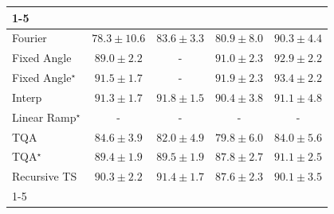 \begin{tabular}{l|cccc|}
\cline{1-5}
\multicolumn{5}{c}{\rule{0pt}{8pt}SV} \\
\midrule
Fourier & {\cellcolor[HTML]{A2BCDA}} \color[HTML]{000000} $78.3\pm 10.6$ & {\cellcolor[HTML]{4295C3}} \color[HTML]{F1F1F1} $83.6\pm 3.3$ & {\cellcolor[HTML]{78ABD0}} \color[HTML]{F1F1F1} $80.9\pm 8.0$ & {\cellcolor[HTML]{045A8D}} \color[HTML]{F1F1F1} $90.3\pm 4.4$ \\
Fixed Angle & {\cellcolor[HTML]{04639B}} \color[HTML]{F1F1F1} $89.0\pm 2.2$ & {\cellcolor[HTML]{000000}} \color[HTML]{F1F1F1} {\cellcolor{white}} \color{black} - & {\cellcolor[HTML]{045382}} \color[HTML]{F1F1F1} $91.0\pm 2.3$ & {\cellcolor[HTML]{023D60}} \color[HTML]{F1F1F1} $92.9\pm 2.2$ \\
Fixed Angle$^\star$ & {\cellcolor[HTML]{034C78}} \color[HTML]{F1F1F1} $91.5\pm 1.7$ & {\cellcolor[HTML]{000000}} \color[HTML]{F1F1F1} {\cellcolor{white}} \color{black} - & {\cellcolor[HTML]{034871}} \color[HTML]{F1F1F1} $91.9\pm 2.3$ & {\cellcolor[HTML]{023858}} \color[HTML]{F1F1F1} $93.4\pm 2.2$ \\
Interp & {\cellcolor[HTML]{034E7B}} \color[HTML]{F1F1F1} $91.3\pm 1.7$ & {\cellcolor[HTML]{034973}} \color[HTML]{F1F1F1} $91.8\pm 1.5$ & {\cellcolor[HTML]{04598C}} \color[HTML]{F1F1F1} $90.4\pm 3.8$ & {\cellcolor[HTML]{045280}} \color[HTML]{F1F1F1} $91.1\pm 4.8$ \\
Linear Ramp$^\star$ & {\cellcolor[HTML]{000000}} \color[HTML]{F1F1F1} {\cellcolor{white}} \color{black} - & {\cellcolor[HTML]{000000}} \color[HTML]{F1F1F1} {\cellcolor{white}} \color{black} - & {\cellcolor[HTML]{000000}} \color[HTML]{F1F1F1} {\cellcolor{white}} \color{black} - & {\cellcolor[HTML]{000000}} \color[HTML]{F1F1F1} {\cellcolor{white}} \color{black} - \\
TQA & {\cellcolor[HTML]{2F8BBE}} \color[HTML]{F1F1F1} $84.6\pm 3.9$ & {\cellcolor[HTML]{63A2CB}} \color[HTML]{F1F1F1} $82.0\pm 4.9$ & {\cellcolor[HTML]{8BB2D4}} \color[HTML]{000000} $79.8\pm 6.0$ & {\cellcolor[HTML]{3B92C1}} \color[HTML]{F1F1F1} $84.0\pm 5.6$ \\
TQA$^\star$ & {\cellcolor[HTML]{046097}} \color[HTML]{F1F1F1} $89.4\pm 1.9$ & {\cellcolor[HTML]{046096}} \color[HTML]{F1F1F1} $89.5\pm 1.9$ & {\cellcolor[HTML]{056CAA}} \color[HTML]{F1F1F1} $87.8\pm 2.7$ & {\cellcolor[HTML]{045280}} \color[HTML]{F1F1F1} $91.1\pm 2.5$ \\
Recursive TS & {\cellcolor[HTML]{045A8D}} \color[HTML]{F1F1F1} $90.3\pm 2.2$ & {\cellcolor[HTML]{034D79}} \color[HTML]{F1F1F1} $91.4\pm 1.7$ & {\cellcolor[HTML]{056DAC}} \color[HTML]{F1F1F1} $87.6\pm 2.3$ & {\cellcolor[HTML]{045B8F}} \color[HTML]{F1F1F1} $90.1\pm 3.5$ \\
\cline{1-5}
\bottomrule
\end{tabular}
